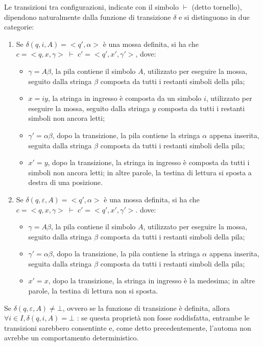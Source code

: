   Le transizioni tra configurazioni, indicate con il simbolo \(\vdash\) (detto tornello), dipendono naturalmente dalla funzione di transizione \(\delta\) e si distinguono in due categorie:
  \begin{enumerate}
    \item Se \(\delta(q,i,A) =<q', \alpha>\) è una mossa definita, si ha che \(c=<q,x,\gamma>\; \vdash \; c'=<q',x',\gamma'>\), dove:
    \begin{itemize}
      \item \(\gamma = A\beta\), la pila contiene il simbolo \(A\), utilizzato per eseguire la mossa, seguito dalla stringa \(\beta\) composta da tutti i restanti simboli della pila;
      \item \(x=iy\), la stringa in ingresso è composta da un simbolo \(i\), utilizzato per eseguire la mossa, seguito dalla stringa \(y\) composta da tutti i restanti simboli non ancora letti;
      \item \(\gamma'=\alpha\beta\), dopo la transizione, la pila contiene la stringa \(\alpha\) appena inserita, seguita dalla stringa \(\beta\) composta da tutti i restanti simboli della pila;
      \item \(x'=y\), dopo la transizione, la stringa in ingresso è composta da tutti i simboli non ancora letti; in altre parole, la testina di lettura si sposta a destra di una posizione. 
    \end{itemize}
    \item Se \(\delta(q,\varepsilon, A) =<q', \alpha>\) è una mossa definita, si ha che \(c=<q,x,\gamma>\;\vdash\; c'=<q',x',\gamma'>\). dove:
    \begin{itemize}
      \item \(\gamma=A\beta\), la pila contiene il simbolo \(A\), utilizzato per eseguire la mossa, seguito dalla stringa \(\beta\) composta da tutti i restanti simboli della pila;
      \item \(\gamma'=\alpha\beta\), dopo la transizione, la pila contiene la stringa \(\alpha\) appena inserita, seguita dalla stringa \(\beta\) composta da tutti i restanti simboli della pila;
      \item \(x'=x\), dopo la transizione, la stringa in ingresso è la medesima; in altre parole, la testina di lettura non si sposta.
    \end{itemize}
  \end{enumerate}

  Se \(\delta(q,\varepsilon, A) \neq \bot\), ovvero se la funzione di transizione è definita, allora \(\forall i \in I, \delta(q,i,A)= \bot\) : se questa proprietà non fosse soddisfatta, entrambe le transizioni sarebbero consentinte e, come detto precedentemente, l'automa non avrebbe un comportamento deterministico.

